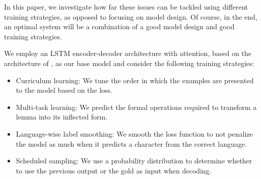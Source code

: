 \documentclass[11pt,a4paper]{article}
\begin{document}
In this paper, we investigate how far these issues can be tackled
using different training strategies, as opposed to focusing on model
design. Of course, in the end, an optimal system will be a
combination of a good model design and good training strategies.





We employ an LSTM encoder-decoder architecture with attention, based on
the architecture of , as our
base model and consider the following training strategies:

\begin{itemize}
\item Curriculum learning: We tune the order in which the examples are presented to the model based on the loss.
\item Multi-task learning: We predict the formal operations required to transform a lemma into its inflected form.
\item Language-wise label smoothing: We smooth the loss function to not penalize the model as much when it predicts a character from the correct language.
\item Scheduled sampling: We use a probability distribution to determine whether to use the previous output or the gold as input when decoding.
\end{itemize}

%
\end{document}
